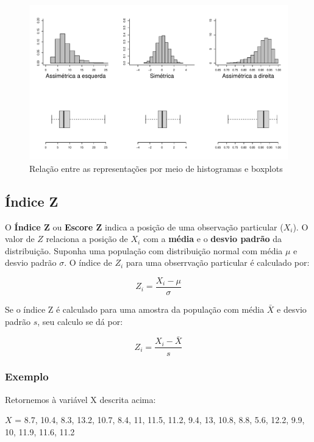 \documentclass[
]{book}
\begin{document}
\begin{figure}

{\centering \includegraphics{probest-cambientais_files/figure-latex/histbox-1} 

}

\caption{Relação entre as representações por meio de histogramas e boxplots}\label{fig:histbox}
\end{figure}

\hypertarget{uxedndice-z}{%
\subsection{Índice Z}\label{uxedndice-z}}

O \textbf{Índice Z} ou \textbf{Escore Z} indica a posição de uma observação particular (\(X_i\)). O valor de \(Z\) relaciona a posição de \(X_i\) com a \textbf{média} e o \textbf{desvio padrão} da distribuição. Suponha uma população com distribuição normal com média \(\mu\) e desvio padrão \(\sigma\). O índice de \(Z_i\) para uma obserrvação particular é calculado por:

\[Z_i = \frac{X_i - \mu}{\sigma}\]

Se o índice Z é calculado para uma amostra da população com média \(\bar{X}\) e desvio padrão \(s\), seu calculo se dá por:

\[Z_i = \frac{X_i - \bar{X}}{s}\]

\hypertarget{exemplo}{%
\subsubsection{Exemplo}\label{exemplo}}

Retornemos à variável X descrita acima:

\(X\) = 8.7, 10.4, 8.3, 13.2, 10.7, 8.4, 11, 11.5, 11.2, 9.4, 13, 10.8, 8.8, 5.6, 12.2, 9.9, 10, 11.9, 11.6, 11.2
\end{document}
